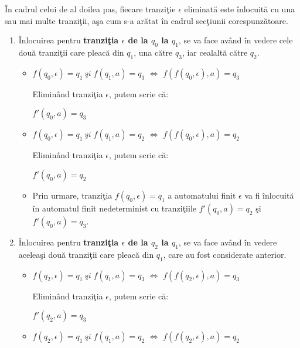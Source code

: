 \begin{enumerate}
\begin{figure}[H]
\end{figure}

În cadrul celui de al doilea pas, fiecare tranziţie $ \epsilon $ eliminată este înlocuită cu una sau mai multe tranziţii, aşa cum s-a arătat în cadrul secţiunii corespunzătoare. 

\begin{enumerate}
\item
Înlocuirea pentru \textbf{tranziţia $ \epsilon $ de la $ q_0 $ la $ q_1 $}, se va face având în vedere cele două tranziţii care pleacă din $ q_1 $, una către $ q_3 $, iar cealaltă către $ q_2 $.

\begin{itemize}
\item
$ f(q_0, \epsilon) = q_1  \; şi \; f(q_1, a) = q_3 $ $ \Leftrightarrow $ $ f(f(q_0, \epsilon),a) = q_3 $ 

Eliminând tranziţia $ \epsilon $, putem scrie că:

$ f'(q_0, a) = q_3 $
\item
$ f(q_0, \epsilon) = q_1  \; şi \; f(q_1, a) = q_2 $ $ \Leftrightarrow $ $ f(f(q_0, \epsilon),a) = q_2 $ 

Eliminând tranziţia $ \epsilon $, putem scrie că:

$ f'(q_0, a) = q_2 $
\item
Prin urmare, tranziţia $ f(q_0, \epsilon) = q_1 $ a automatului finit $ \epsilon $ va fi înlocuită în automatul finit nedeterminist cu tranziţiile $ f'(q_0, a) = q_2 $ şi $ f'(q_0, a) = q_3 $.
\end{itemize}

\item
Înlocuirea pentru \textbf{tranziţia $ \epsilon $ de la $ q_2 $ la $ q_1 $}, se va face având în vedere aceleaşi două tranziţii care pleacă din $ q_1 $, care au fost considerate anterior.

\begin{itemize}
\item
$ f(q_2, \epsilon) = q_1  \; şi \; f(q_1, a) = q_3 $ $ \Leftrightarrow $ $ f(f(q_2, \epsilon),a) = q_3 $ 

Eliminând tranziţia $ \epsilon $, putem scrie că:

$ f'(q_2, a) = q_3 $
\item
$ f(q_2, \epsilon) = q_1  \; şi \; f(q_1, a) = q_2 $ $ \Leftrightarrow $ $ f(f(q_2, \epsilon),a) = q_2 $ 


\end{itemize}
\end{enumerate}
\end{enumerate}
